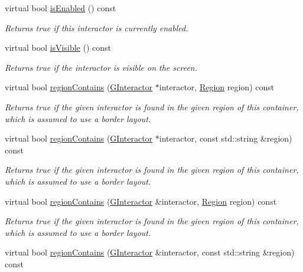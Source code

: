 \begin{DoxyCompactItemize}
virtual bool \mbox{\hyperlink{classGInteractor_aacb819fb241851fd9fc045271baa4034}{is\+Enabled}} () const
\begin{DoxyCompactList}\small\item\em Returns true if this interactor is currently enabled. \end{DoxyCompactList}\item 
virtual bool \mbox{\hyperlink{classGInteractor_a9d8a6cfb13917785c143e74d40e4e2be}{is\+Visible}} () const
\begin{DoxyCompactList}\small\item\em Returns true if the interactor is visible on the screen. \end{DoxyCompactList}\item 
virtual bool \mbox{\hyperlink{classGContainer_a8909db9abf4dc80058f9e4a7b90ea2d0}{region\+Contains}} (\mbox{\hyperlink{classGInteractor}{G\+Interactor}} $\ast$interactor, \mbox{\hyperlink{classGContainer_a81a01a86de31071a92e6cce0bab9bc4b}{Region}} region) const
\begin{DoxyCompactList}\small\item\em Returns true if the given interactor is found in the given region of this container, which is assumed to use a border layout. \end{DoxyCompactList}\item 
virtual bool \mbox{\hyperlink{classGContainer_a84a56bae6b8883d27e44d51c31b2bfc5}{region\+Contains}} (\mbox{\hyperlink{classGInteractor}{G\+Interactor}} $\ast$interactor, const std\+::string \&region) const
\begin{DoxyCompactList}\small\item\em Returns true if the given interactor is found in the given region of this container, which is assumed to use a border layout. \end{DoxyCompactList}\item 
virtual bool \mbox{\hyperlink{classGContainer_aa4cf95952747fd421a2b005eedbc662c}{region\+Contains}} (\mbox{\hyperlink{classGInteractor}{G\+Interactor}} \&interactor, \mbox{\hyperlink{classGContainer_a81a01a86de31071a92e6cce0bab9bc4b}{Region}} region) const
\begin{DoxyCompactList}\small\item\em Returns true if the given interactor is found in the given region of this container, which is assumed to use a border layout. \end{DoxyCompactList}\item 
virtual bool \mbox{\hyperlink{classGContainer_ad67deacd62d3248fbe57ccbd4e96fb50}{region\+Contains}} (\mbox{\hyperlink{classGInteractor}{G\+Interactor}} \&interactor, const std\+::string \&region) const

\end{DoxyCompactItemize}
